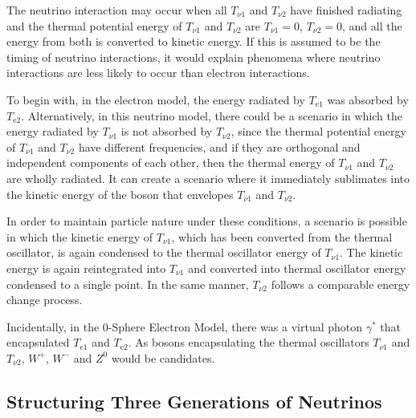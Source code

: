 \documentclass[%
 reprint,
 amsmath,amssymb,
 aps,
]{revtex4-1}
\numberwithin{equation}{section}%
\begin{document}
The neutrino interaction may occur when all $T_{\nu \mathrm{1}}$ and $T_{\nu \mathrm{2}}$ have finished radiating and the thermal potential energy of $T_{\nu \mathrm{1}}$ and $T_{\nu \mathrm{2}}$ are $T_{\nu \mathrm{1}} = 0$, $T_{\nu \mathrm{2}} = 0$, and all the energy from both is converted to kinetic energy. If this is assumed to be the timing of neutrino interactions, it would explain phenomena where neutrino interactions are less likely to occur than electron interactions.

To begin with, in the electron model, the energy radiated by $T_{\mathrm{e1}}$ was absorbed by $T_{\mathrm{e2}}$. Alternatively, in this neutrino model, there could be a scenario in which the energy radiated by $T_{\nu \mathrm{1}}$ is not absorbed by $T_{\nu \mathrm{2}}$, since the thermal potential energy of $T_{\nu \mathrm{1}}$ and $T_{\nu \mathrm{2}}$ have different frequencies, and if they are orthogonal and independent components of each other, then the thermal energy of $T_{\nu \mathrm{1}}$ and $T_{\nu \mathrm{2}}$ are wholly radiated. It can create a scenario where it immediately sublimates into the kinetic energy of the boson that envelopes $T_{\nu \mathrm{1}}$ and $T_{\nu \mathrm{2}}$.

In order to maintain particle nature under these conditions, a scenario is possible in which the kinetic energy of $T_{\nu \mathrm{1}}$, which has been converted from the thermal oscillator, is again condensed to the thermal oscillator energy of $T_{\nu \mathrm{1}}$. The kinetic energy is again reintegrated into $T_{\nu \mathrm{1}}$ and converted into thermal oscillator energy condensed to a single point. In the same manner, $T_{\nu \mathrm{2}}$ follows a comparable energy change process.

Incidentally, in the 0-Sphere Electron Model, there was a virtual photon $\gamma^{*}$ that encapsulated $T_{\mathrm{e1}}$ and $T_{\mathrm{e2}}$. As bosons encapsulating the thermal oscillators $T_{\nu \mathrm{1}}$ and $T_{\nu \mathrm{2}}$, $W^+$, $W^-$ and $Z^0$ would be candidates.



\subsection{Structuring Three Generations of Neutrinos}

\end{document}
